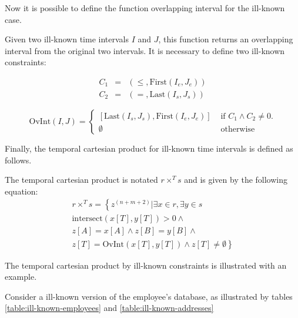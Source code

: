 \documentclass{llncs}
\begin{document}
Now it is possible to define the function overlapping interval for the ill-known case.

\begin{definition}
 \label{def:ik-overlapping-interval}
Given two ill-known time intervals $I$ and $J$, this function returns an overlapping interval from the original two intervals. It is necessary to define two ill-known constraints:

\begin{align}
 \label{eq:ilc-smaller-than}
C_1 &=& \left(\leq,\mbox{First}\left(I_e, J_e \right)\right) \\
C_2 &=& \left(=, \mbox{Last}\left( I_s, J_s \right)\right)
\end{align}



\begin{equation}
 \mbox{OvInt}\left(I, J \right) = 
\begin{cases}
\left[\mbox{Last}\left( I_s, J_s \right), \mbox{First}\left(I_e, J_e \right) \right] & \mbox{ if } C_1 \wedge C_2 \neq 0.  \\
\emptyset & \mbox{ otherwise } 
\end{cases}
\end{equation}
\end{definition}

Finally, the temporal cartesian product for ill-known time intervals is defined as follows.

\begin{definition}
 \label{def:temporal-cartesian-product-ik}
The temporal cartesian product is notated $r \times^T s$ and is given by the following equation:
\begin{align}
 \label{eq:ik-temporal-cartesian-product}
r \times^T s = \left \lbrace z^{\left(n+m+2\right)}  | \exists x \in r, \exists y \in s \right. \\
\nonumber
\mbox{intersect}\left(x[T], y[T] \right) > 0 \wedge \\
\nonumber
z\left[A\right] = x\left[A\right] \wedge z\left[B\right] = y \left[B \right] \wedge \\
\nonumber
\left.  z\left[T \right] = \mbox{OvInt}\left(x\left[T\right], y\left[T\right] \right) \wedge z\left[T\right] \neq \emptyset  \right \rbrace
\end{align}
\end{definition}

The temporal cartesian product by ill-known constraints is illustrated with an example.
\begin{example}
 \label{ex:temporal-ill-known-constraint-ik}
Consider a ill-known version of the employee's database, as illustrated by tables \ref{table:ill-known-employees} and \ref{table:ill-known-addresses}
\end{example}
\end{document}
